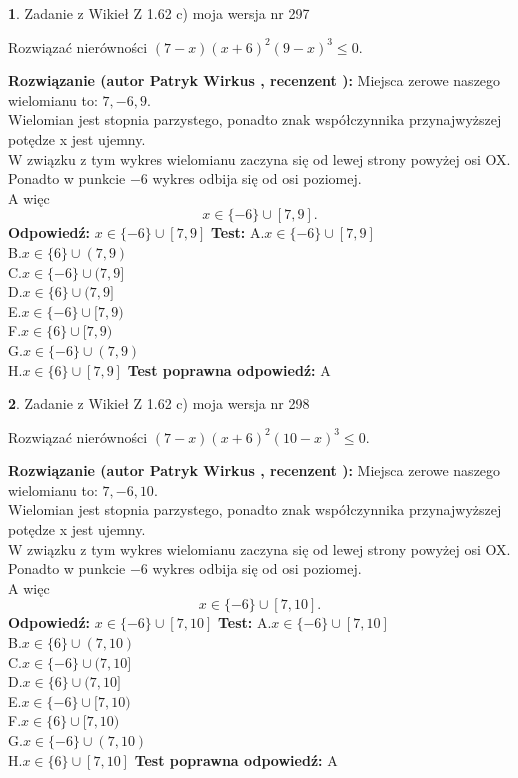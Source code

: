 \documentclass[12pt, a4paper]{article}
\theoremstyle{definition} %
\newtheorem{zad}{}
\newcommand{\zadStart}[1]{\begin{zad}#1\newline}
\newcommand{\zadStop}{\end{zad}}
\newcommand{\rozwStart}[2]{\noindent \textbf{Rozwiązanie (autor #1 , recenzent #2): }\newline}
\newcommand{\rozwStop}{\newline}
\newcommand{\odpStart}{\noindent \textbf{Odpowiedź:}\newline}
\newcommand{\odpStop}{\newline}
\newcommand{\testStart}{\noindent \textbf{Test:}\newline}
\newcommand{\testStop}{\newline}
\newcommand{\kluczStart}{\noindent \textbf{Test poprawna odpowiedź:}\newline}
\newcommand{\kluczStop}{\newline}
\begin{document}
\zadStart{Zadanie z Wikieł Z 1.62 c) moja wersja nr 297}

Rozwiązać nierówności $(7-x)(x+6)^{2}(9-x)^{3}\le0$.
\zadStop
\rozwStart{Patryk Wirkus}{}
Miejsca zerowe naszego wielomianu to: $7, -6, 9$.\\
Wielomian jest stopnia parzystego, ponadto znak współczynnika przy\linebreak najwyższej potędze x jest ujemny.\\ W związku z tym wykres wielomianu zaczyna się od lewej strony powyżej osi OX.\\
Ponadto w punkcie $-6$ wykres odbija się od osi poziomej.\\
A więc $$x \in \{-6\} \cup [7,9].$$
\rozwStop
\odpStart
$x \in \{-6\} \cup [7,9]$
\odpStop
\testStart
A.$x \in \{-6\} \cup [7,9]$\\
B.$x \in \{6\} \cup (7,9)$\\
C.$x \in \{-6\} \cup (7,9]$\\
D.$x \in \{6\} \cup (7,9]$\\
E.$x \in \{-6\} \cup [7,9)$\\
F.$x \in \{6\} \cup [7,9)$\\
G.$x \in \{-6\} \cup (7,9)$\\
H.$x \in \{6\} \cup [7,9]$
\testStop
\kluczStart
A
\kluczStop



\zadStart{Zadanie z Wikieł Z 1.62 c) moja wersja nr 298}

Rozwiązać nierówności $(7-x)(x+6)^{2}(10-x)^{3}\le0$.
\zadStop
\rozwStart{Patryk Wirkus}{}
Miejsca zerowe naszego wielomianu to: $7, -6, 10$.\\
Wielomian jest stopnia parzystego, ponadto znak współczynnika przy\linebreak najwyższej potędze x jest ujemny.\\ W związku z tym wykres wielomianu zaczyna się od lewej strony powyżej osi OX.\\
Ponadto w punkcie $-6$ wykres odbija się od osi poziomej.\\
A więc $$x \in \{-6\} \cup [7,10].$$
\rozwStop
\odpStart
$x \in \{-6\} \cup [7,10]$
\odpStop
\testStart
A.$x \in \{-6\} \cup [7,10]$\\
B.$x \in \{6\} \cup (7,10)$\\
C.$x \in \{-6\} \cup (7,10]$\\
D.$x \in \{6\} \cup (7,10]$\\
E.$x \in \{-6\} \cup [7,10)$\\
F.$x \in \{6\} \cup [7,10)$\\
G.$x \in \{-6\} \cup (7,10)$\\
H.$x \in \{6\} \cup [7,10]$
\testStop
\kluczStart
A
\kluczStop
\end{document}
